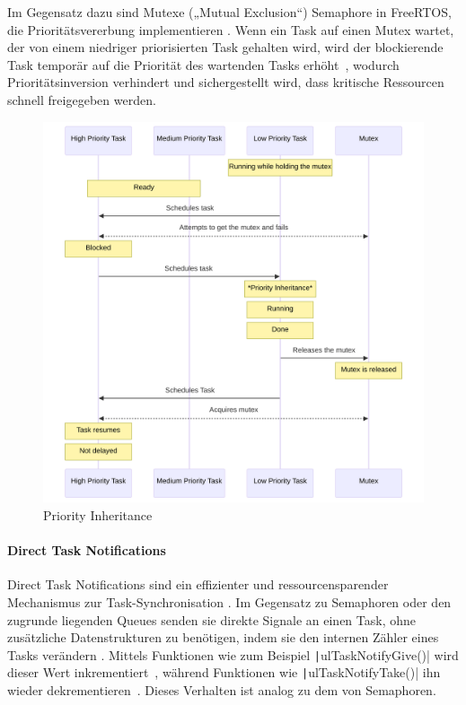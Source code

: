 Im Gegensatz dazu sind Mutexe („Mutual Exclusion“) Semaphore in FreeRTOS, die
Prioritätsvererbung implementieren \cite{freertos_mutexes}. Wenn ein Task auf
einen Mutex wartet, der von einem niedriger priorisierten Task gehalten wird,
wird der blockierende Task temporär auf die Priorität des wartenden Tasks
erhöht~\cite{FreertosForumSemphMtx}, wodurch Prioritätsinversion verhindert und
sichergestellt wird, dass kritische Ressourcen schnell freigegeben werden.

\begin{figure}[htb]
    \centering
    \includegraphics[width=1\textwidth]{assets/prio_inheritance}
    \caption{Priority Inheritance}
\end{figure}

\paragraph{Direct Task Notifications}

Direct Task Notifications sind ein effizienter und ressourcensparender
Mechanismus zur Task-Synchronisation \cite{freertos_task_notifications_desc}. Im
Gegensatz zu Semaphoren oder den zugrunde liegenden Queues senden sie direkte
Signale an einen Task, ohne zusätzliche Datenstrukturen zu benötigen, indem sie
den internen Zähler eines Tasks verändern \cite{freertos_tasks_c_213}. Mittels
Funktionen wie zum Beispiel \texttt|ulTaskNotifyGive()| wird dieser Wert
inkrementiert~\cite{freertos_tasks_c_4296}, während Funktionen wie
\texttt|ulTaskNotifyTake()| ihn wieder
dekrementieren~\cite{freertos_tasks_c_3926}. Dieses Verhalten ist analog zu dem
von Semaphoren.

